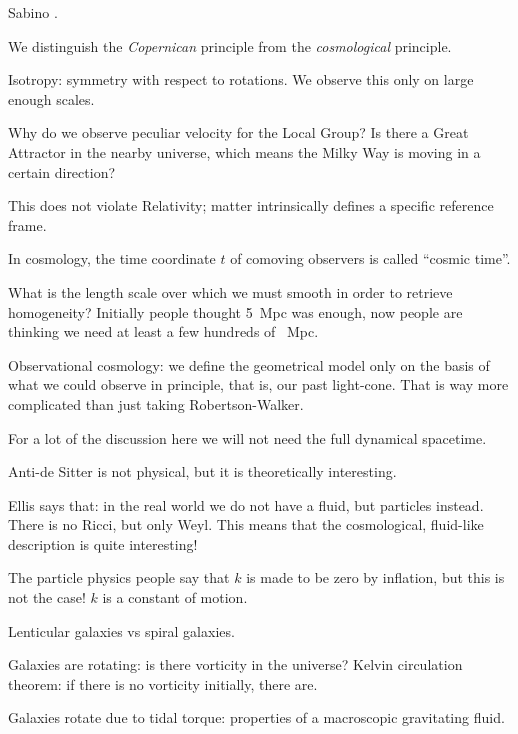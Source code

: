 \documentclass[main.tex]{subfiles}
\begin{document}

Sabino \heartsuit. 

We distinguish the \emph{Copernican} principle from the \emph{cosmological} principle. 

Isotropy: symmetry with respect to rotations. 
We observe this only on large enough scales. 

Why do we observe peculiar velocity for the Local Group?
Is there a Great Attractor in the nearby universe, which means the 
Milky Way is moving in a certain direction? 

This does not violate Relativity; matter intrinsically defines 
a specific reference frame. 

In cosmology, the time coordinate \(t\) of comoving observers 
is called ``cosmic time''. 

What is the length scale over which we must smooth in order to 
retrieve homogeneity? 
Initially people thought \SI{5}{Mpc} was enough, 
now people are thinking we need at least a few hundreds of \SI{}{Mpc}. 

Observational cosmology: we define the geometrical model only on the basis 
of what we could observe in principle, that is, our past light-cone. 
That is way more complicated than just taking Robertson-Walker. 

For a lot of the discussion here we will not need the full dynamical spacetime. 

Anti-de Sitter is not physical, but it is theoretically interesting. 

Ellis says that: in the real world we do not have a fluid, but particles instead. 
There is no Ricci, but only Weyl. 
This means that the cosmological, fluid-like description is quite interesting! 

The particle physics people say that \(k\) is made to be zero by inflation,
but this is not the case! \(k\) is a constant of motion. 

Lenticular galaxies vs spiral galaxies. 

Galaxies are rotating: is there vorticity in the universe? 
Kelvin circulation theorem: if there is no vorticity initially, there 
are. 

Galaxies rotate due to tidal torque: properties of a macroscopic gravitating fluid. 

 
\end{document}
